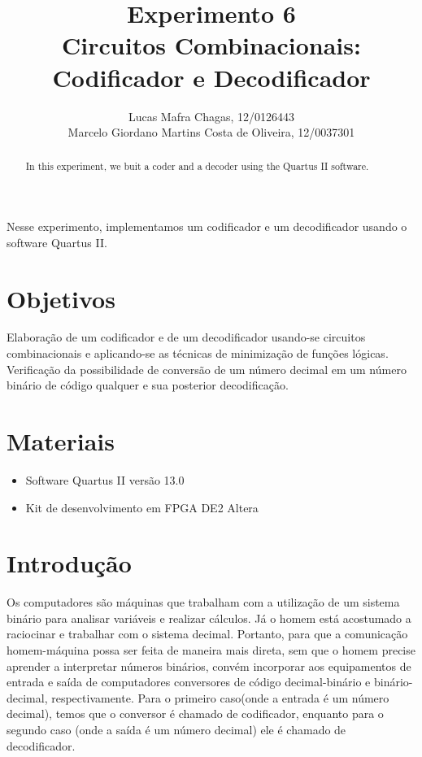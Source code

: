 \documentclass[12pt]{article}
\title{Experimento 6\\ 
	Circuitos Combinacionais: Codificador e Decodificador}
\author{
	Lucas Mafra Chagas, 12/0126443 \\
	Marcelo Giordano Martins Costa de Oliveira,  12/0037301
}
\begin{document}
 

\maketitle

 \begin{abstract}
   In this experiment, we buit a coder and a decoder using the Quartus II software.
 \end{abstract}
     
 \begin{resumo} 
	Nesse experimento, implementamos um codificador e um decodificador usando o software Quartus II.
 \end{resumo}


\section{Objetivos}
\label{sec:Objetivos}

Elaboração de um codificador e de um decodificador usando-se circuitos combinacionais e
aplicando-se as técnicas de minimização de funções lógicas. Verificação da possibilidade
de conversão de um número decimal em um número binário de código qualquer e sua
posterior decodificação.

\section{Materiais} 
\label{sec:Materiais}

\begin{itemize}
    \item Software Quartus II versão 13.0
	\item Kit de desenvolvimento em FPGA DE2 Altera
    
\end{itemize}


\section{Introdução}
\label{sec:Introducao}

Os computadores são máquinas que trabalham com a utilização de um sistema binário para analisar variáveis e realizar cálculos. Já o homem está acostumado a raciocinar e trabalhar com o sistema decimal. Portanto, para que a comunicação homem-máquina possa ser feita de maneira mais direta, sem que o homem precise aprender a interpretar números binários, convém incorporar aos equipamentos de entrada e saída de computadores conversores de código decimal-binário e binário-decimal, respectivamente. Para o primeiro caso(onde a entrada é um número decimal), temos que o conversor é chamado de codificador, enquanto para o segundo caso (onde a saída é um número decimal) ele é chamado de decodificador.
\end{document}
